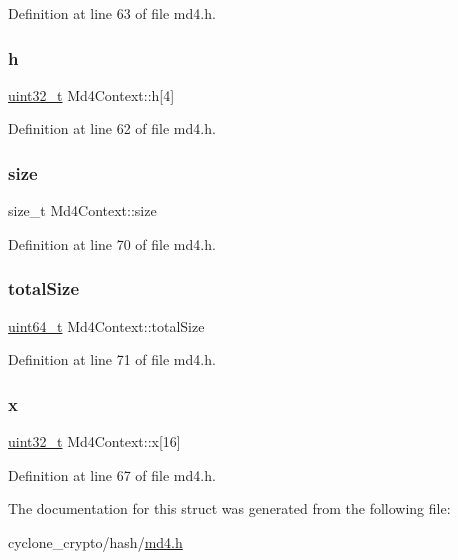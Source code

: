 Definition at line 63 of file md4.\+h.

\mbox{\label{structMd4Context_ab6a8fb9f73f48392e40c069e43af33c1}} 
\subsubsection{\texorpdfstring{h}{h}}
{\footnotesize\ttfamily \hyperlink{stdint_8h_a435d1572bf3f880d55459d9805097f62}{uint32\+\_\+t} Md4\+Context\+::h\mbox{[}4\mbox{]}}



Definition at line 62 of file md4.\+h.

\mbox{\label{structMd4Context_acdaf9c8b63010710962be1805b42e703}} 
\subsubsection{\texorpdfstring{size}{size}}
{\footnotesize\ttfamily size\+\_\+t Md4\+Context\+::size}



Definition at line 70 of file md4.\+h.

\mbox{\label{structMd4Context_a16bb74c444bc226e324b473afd9a7c60}} 
\subsubsection{\texorpdfstring{total\+Size}{totalSize}}
{\footnotesize\ttfamily \hyperlink{stdint_8h_aec6fcb673ff035718c238c8c9d544c47}{uint64\+\_\+t} Md4\+Context\+::total\+Size}



Definition at line 71 of file md4.\+h.

\mbox{\label{structMd4Context_a92e939d79039860f83c5245e8e6363e8}} 
\subsubsection{\texorpdfstring{x}{x}}
{\footnotesize\ttfamily \hyperlink{stdint_8h_a435d1572bf3f880d55459d9805097f62}{uint32\+\_\+t} Md4\+Context\+::x\mbox{[}16\mbox{]}}



Definition at line 67 of file md4.\+h.



The documentation for this struct was generated from the following file\+:\begin{DoxyCompactItemize}
\item 
cyclone\+\_\+crypto/hash/\hyperlink{md4_8h}{md4.\+h}\end{DoxyCompactItemize}
